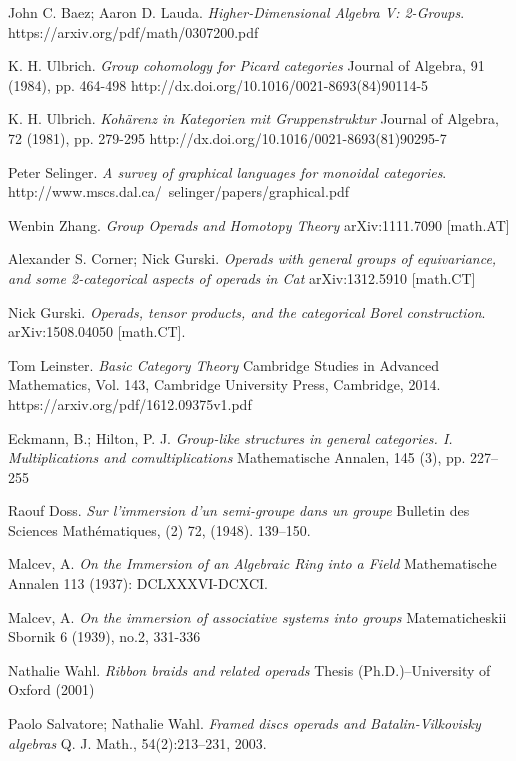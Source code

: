 \documentclass[a4paper,12pt,times,numbered,print,index]{Style/PhDThesisPSnPDF}
\numberwithin{equation}{section}
\theoremstyle{example}
\theoremstyle{named}
\begin{document}
 
\begin{thebibliography}{9}

John C. Baez; Aaron D. Lauda.
\textit{Higher-Dimensional Algebra V: 2-Groups}.
https://arxiv.org/pdf/math/0307200.pdf 

K. H. Ulbrich.
\textit{Group cohomology for Picard categories}
Journal of Algebra, 91 (1984), pp. 464-498 
http://dx.doi.org/10.1016/0021-8693(84)90114-5

K. H. Ulbrich.
\textit{Kohärenz in Kategorien mit Gruppenstruktur}
Journal of Algebra, 72 (1981), pp. 279-295
http://dx.doi.org/10.1016/0021-8693(81)90295-7

Peter Selinger.
\textit{A survey of graphical languages for monoidal categories}.
http://www.mscs.dal.ca/~selinger/papers/graphical.pdf

Wenbin Zhang.
\textit{Group Operads and Homotopy Theory}
arXiv:1111.7090 [math.AT]

Alexander S. Corner; Nick Gurski.
\textit{Operads with general groups of equivariance, and some 2-categorical aspects of operads in Cat}
arXiv:1312.5910 [math.CT]

Nick Gurski. 
\textit{Operads, tensor products, and the categorical Borel construction}. 
 arXiv:1508.04050 [math.CT].

Tom Leinster.
\textit{Basic Category Theory}
Cambridge Studies in Advanced Mathematics, Vol. 143, Cambridge University Press, Cambridge, 2014.
https://arxiv.org/pdf/1612.09375v1.pdf

Eckmann, B.; Hilton, P. J. 
\textit{Group-like structures in general categories. I. Multiplications and comultiplications}
Mathematische Annalen, 145 (3), pp. 227–255

Raouf Doss.
\textit{Sur l'immersion d'un semi-groupe dans un groupe}
Bulletin des Sciences Mathématiques, (2) 72, (1948). 139–150. 

Malcev, A.
\textit{On the Immersion of an Algebraic Ring into a Field}
Mathematische Annalen 113 (1937): DCLXXXVI-DCXCI. 

Malcev, A.
\textit{On the immersion of associative systems into groups}
Matematicheskii Sbornik 6 (1939), no.2, 331-336

Nathalie Wahl.
\textit{Ribbon braids and related operads}
Thesis (Ph.D.)–University of Oxford (2001)

Paolo Salvatore; Nathalie Wahl. 
\textit{Framed discs operads and Batalin-Vilkovisky algebras}
Q. J. Math., 54(2):213–231, 2003.

\end{thebibliography}
\end{document}
